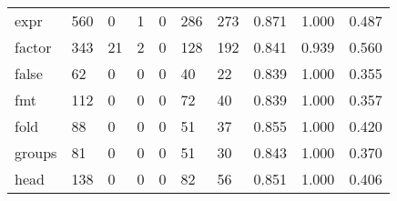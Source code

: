 \begin{longtable}{lp{2.0cm}p{2.0cm}p{2.0cm}p{2.0cm}p{2.0cm}p{2.0cm}p{2.0cm}p{2.0cm}p{2.0cm}}
expr      &                    560 &                                             0 &                                            1 &                                           0 &                                          286 &                                        273 &                                0.871 &                                  1.000 &                                0.487 \\
factor    &                    343 &                                            21 &                                            2 &                                           0 &                                          128 &                                        192 &                                0.841 &                                  0.939 &                                0.560 \\
false     &                     62 &                                             0 &                                            0 &                                           0 &                                           40 &                                         22 &                                0.839 &                                  1.000 &                                0.355 \\
fmt       &                    112 &                                             0 &                                            0 &                                           0 &                                           72 &                                         40 &                                0.839 &                                  1.000 &                                0.357 \\
fold      &                     88 &                                             0 &                                            0 &                                           0 &                                           51 &                                         37 &                                0.855 &                                  1.000 &                                0.420 \\
groups    &                     81 &                                             0 &                                            0 &                                           0 &                                           51 &                                         30 &                                0.843 &                                  1.000 &                                0.370 \\
head      &                    138 &                                             0 &                                            0 &                                           0 &                                           82 &                                         56 &                                0.851 &                                  1.000 &                                0.406 \\

\end{longtable}
